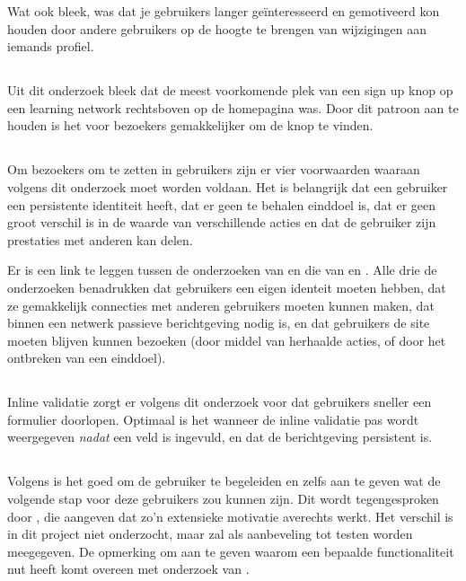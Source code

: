 \documentclass[a4paper, 10pt, pdftex]{report}
\begin{document}
        Wat ook bleek, was dat je gebruikers langer ge\"interesseerd en gemotiveerd kon houden door andere gebruikers op de hoogte te brengen van wijzigingen aan iemands profiel.

      \subsection{\cite{Editorial2008}}
      Uit dit onderzoek bleek dat de meest voorkomende plek van een sign up knop op een learning network rechtsboven op de homepagina was. Door dit patroon aan te houden is het voor bezoekers gemakkelijker om de knop te vinden.

      \subsection{\cite{Sloep2009}}
      Om bezoekers om te zetten in gebruikers zijn er vier voorwaarden waaraan volgens dit onderzoek moet worden voldaan. Het is belangrijk dat een gebruiker een persistente identiteit heeft, dat er geen te behalen einddoel is, dat er geen groot verschil is in de waarde van verschillende acties en dat de gebruiker zijn prestaties met anderen kan delen.

      Er is een link te leggen tussen de onderzoeken van \citeauthor{Sloep2009} en die van \citeauthor{Brouns2008} en \citeauthor{Sohn2005}. Alle drie de onderzoeken benadrukken dat gebruikers een eigen identeit moeten hebben, dat ze gemakkelijk connecties met anderen gebruikers moeten kunnen maken, dat binnen een netwerk passieve berichtgeving nodig is, en dat gebruikers de site moeten blijven kunnen bezoeken (door middel van herhaalde acties, of door het ontbreken van een einddoel).

      \subsection{\cite{Wroblewski2009}}
        Inline validatie zorgt er volgens dit onderzoek voor dat gebruikers sneller een formulier doorlopen. Optimaal is het wanneer de inline validatie pas wordt weergegeven \emph{nadat} een veld is ingevuld, en dat de berichtgeving persistent is.

      \subsection{\cite{Alfrink2008}}
        Volgens \citeauthor{Alfrink2008} is het goed om de gebruiker te begeleiden en zelfs aan te geven wat de volgende stap voor deze gebruikers zou kunnen zijn. Dit wordt tegengesproken door \cite{Beenen2004}, die aangeven dat zo'n extensieke motivatie averechts werkt. Het verschil is in dit project niet onderzocht, maar zal als aanbeveling tot testen worden meegegeven. De opmerking om aan te geven waarom een bepaalde functionaliteit nut heeft komt overeen met onderzoek van \cite{Brouns2008}.
\end{document}
